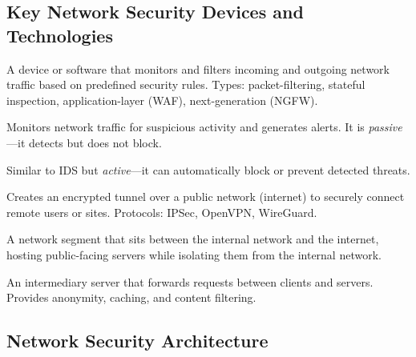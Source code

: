 \documentclass[11pt,a4paper]{article}
\begin{document}
\subsection{Key Network Security Devices and Technologies}

\begin{definitionbox}[Firewall]
A device or software that monitors and filters incoming and outgoing network traffic based on predefined security rules. Types: packet-filtering, stateful inspection, application-layer (WAF), next-generation (NGFW).
\end{definitionbox}

\begin{definitionbox}
Monitors network traffic for suspicious activity and generates alerts. It is \emph{passive}---it detects but does not block.
\end{definitionbox}

\begin{definitionbox}
Similar to IDS but \emph{active}---it can automatically block or prevent detected threats.
\end{definitionbox}

\begin{definitionbox}
Creates an encrypted tunnel over a public network (internet) to securely connect remote users or sites. Protocols: IPSec, OpenVPN, WireGuard.
\end{definitionbox}

\begin{definitionbox}
A network segment that sits between the internal network and the internet, hosting public-facing servers while isolating them from the internal network.
\end{definitionbox}

\begin{definitionbox}
An intermediary server that forwards requests between clients and servers. Provides anonymity, caching, and content filtering.
\end{definitionbox}

\subsection{Network Security Architecture}
\end{document}
